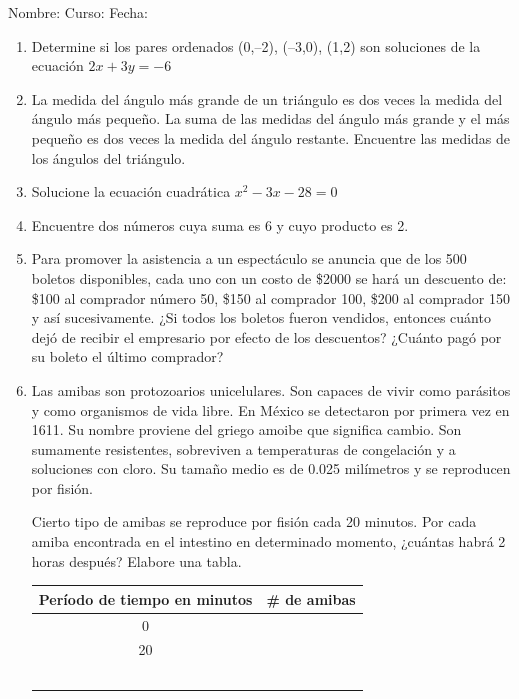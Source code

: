 \documentclass[fleqn]{article}
\newcommand{\LineaNombre}{%
\par
\vspace{\baselineskip}
Nombre:\hrulefill \; Curso: \underline{\hspace*{48pt}} \; Fecha: \underline{\hspace*{2.5cm}} \relax
\par}
\begin{document}
\LineaNombre
\begin{enumerate}
\item Determine si los pares ordenados (0,--2), (--3,0), (1,2) son soluciones de la ecuación $2x+3y=-6$\noanswer
\item \label{ej56} La medida del ángulo más grande de un triángulo es dos veces la medida del ángulo más pequeño. La suma de las medidas del ángulo más grande y el más pequeño es dos veces la medida del ángulo restante. Encuentre las medidas de los ángulos del triángulo.\noanswer
\item Solucione la ecuación cuadrática $x^{2}-3x-28=0$\noanswer
\newpage
\item Encuentre dos números cuya suma es 6 y cuyo producto es 2.\noanswer
 \item Para promover la asistencia a un espectáculo se anuncia que de los 500 boletos disponibles, cada uno con un costo de \$2000 se hará un descuento de: \$100 al comprador número 50, \$150 al comprador 100, \$200 al comprador 150 y así sucesivamente. ¿Si todos los boletos fueron vendidos, entonces cuánto dejó de recibir el empresario por efecto de los descuentos? ¿Cuánto pagó por su boleto el último comprador? \noanswer
 \item Las amibas son protozoarios unicelulares. Son capaces de vivir como parásitos y como organismos de vida libre. En México se detectaron por primera vez en 1611. Su nombre proviene del griego amoibe que significa cambio. Son sumamente resistentes, sobreviven a temperaturas de congelación y a soluciones con cloro. Su tamaño medio es de 0.025 milímetros y se reproducen por fisión.

Cierto tipo de amibas se reproduce por fisión cada 20 minutos. Por cada amiba encontrada en el intestino en determinado momento, ¿cuántas habrá 2 horas después? Elabore una tabla.
\begin{center}
\begin{tabular}{|c|c|}
\hline 
Período de tiempo en minutos & \# de amibas \\ 
\hline 
0 &  \\ 
\hline 
20 &  \\ 
\hline 
 &  \\ 
\hline 
 &  \\ 
\hline 
 &  \\ 
\hline 
 &  \\ 
\hline 
 &  \\ 
\hline 
\end{tabular} 

\end{center}
 \end{enumerate}
\end{document}
